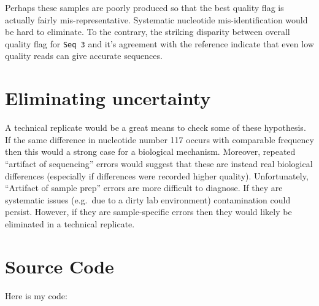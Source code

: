 \documentclass[12pt]{article}
\renewcommand{\=}[1]{\stackrel{#1}{=}} %
\theoremstyle{definition}
\begin{document}
	Perhaps these samples are poorly produced so that the best quality flag is actually fairly mis-representative. Systematic nucleotide mis-identification would be hard to eliminate.
	To the contrary, the striking disparity between overall quality flag for \texttt{Seq 3} and it's agreement with the reference indicate that even low quality reads can give accurate sequences.
	
	\section{Eliminating uncertainty}
	A technical replicate would be a great means to check some of these hypothesis. If the same difference in nucleotide number 117 occurs with comparable frequency then this would a strong case for a biological mechanism. Moreover, repeated ``artifact of sequencing'' errors would suggest that these are instead real biological differences (especially if differences were recorded higher quality). 
	Unfortunately, ``Artifact of sample prep'' errors are more difficult to diagnose. If they are systematic issues (e.g.\ due to a dirty lab environment) contamination could persist. However, if they are sample-specific errors then they would likely be eliminated in a technical replicate.
	
	\section{Source Code}
	Here is my code:
	
\end{document}
